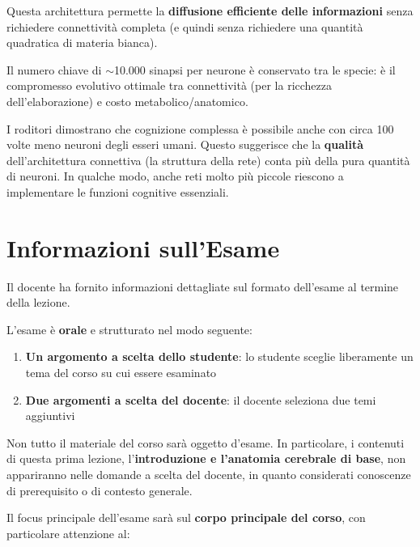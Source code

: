 Questa architettura permette la \textbf{diffusione efficiente delle informazioni} senza richiedere connettività completa (e quindi senza richiedere una quantità quadratica di materia bianca).

Il numero chiave di $\sim$10.000 sinapsi per neurone è conservato tra le specie: è il compromesso evolutivo ottimale tra connettività (per la ricchezza dell'elaborazione) e costo metabolico/anatomico.

\begin{tcolorbox}[colback=gray!5, colframe=gray!40, arc=2mm, boxrule=0.5pt]
I roditori dimostrano che cognizione complessa è possibile anche con circa 100 volte meno neuroni degli esseri umani. Questo suggerisce che la \textbf{qualità} dell'architettura connettiva (la struttura della rete) conta più della pura quantità di neuroni. In qualche modo, anche reti molto più piccole riescono a implementare le funzioni cognitive essenziali.
\end{tcolorbox}

\newpage
\section{Informazioni sull'Esame}

Il docente ha fornito informazioni dettagliate sul formato dell'esame al termine della lezione.

L'esame è \textbf{orale} e strutturato nel modo seguente:

\begin{enumerate}
    \item \textbf{Un argomento a scelta dello studente}: lo studente sceglie liberamente un tema del corso su cui essere esaminato
    \item \textbf{Due argomenti a scelta del docente}: il docente seleziona due temi aggiuntivi
\end{enumerate}

\begin{tcolorbox}[colback=gray!5, colframe=gray!40, arc=2mm, boxrule=0.5pt]
Non tutto il materiale del corso sarà oggetto d'esame. In particolare, i contenuti di questa prima lezione, l'\textbf{introduzione e l'anatomia cerebrale di base}, non appariranno nelle domande a scelta del docente, in quanto considerati conoscenze di prerequisito o di contesto generale.
\end{tcolorbox}

Il focus principale dell'esame sarà sul \textbf{corpo principale del corso}, con particolare attenzione al:

